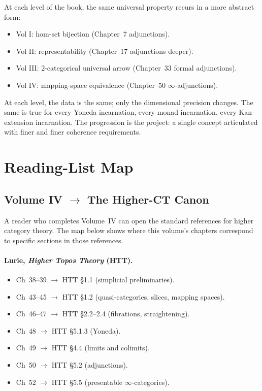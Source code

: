 \begin{remark}[A theme]
At each level of the book, the same universal property recurs in a more
abstract form:
\begin{itemize}
  \item Vol I: hom-set bijection (Chapter~7 adjunctions).
  \item Vol II: representability (Chapter~17 adjunctions deeper).
  \item Vol III: $2$-categorical universal arrow (Chapter~33 formal adjunctions).
  \item Vol IV: mapping-space equivalence (Chapter~50 $\infty$-adjunctions).
\end{itemize}
At each level, the data is the same; only the dimensional precision changes.
The same is true for every Yoneda incarnation, every monad incarnation,
every Kan-extension incarnation. The progression is the project: a
single concept articulated with finer and finer coherence requirements.
\end{remark}


\section{Reading-List Map}
\label{sec:reading-map}

\subsection{Volume IV $\to$ The Higher-CT Canon}

A reader who completes Volume~IV can open the standard references for
higher category theory. The map below shows where this volume's chapters
correspond to specific sections in those references.

\paragraph{Lurie, \emph{Higher Topos Theory} (HTT).}
\begin{itemize}
  \item Ch~38--39 $\to$ HTT §1.1 (simplicial preliminaries).
  \item Ch~43--45 $\to$ HTT §1.2 (quasi-categories, slices, mapping spaces).
  \item Ch~46--47 $\to$ HTT §2.2--2.4 (fibrations, straightening).
  \item Ch~48 $\to$ HTT §5.1.3 (Yoneda).
  \item Ch~49 $\to$ HTT §4.4 (limits and colimits).
  \item Ch~50 $\to$ HTT §5.2 (adjunctions).
  \item Ch~52 $\to$ HTT §5.5 (presentable $\infty$-categories).
\end{itemize}

